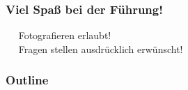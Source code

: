 \documentclass[10pt,t]{beamer}
\begin{document}
\begin{frame}
\begin{columns}
\end{columns}
\vspace*{-8pt}
\end{frame}



\begin{frame}
\frametitle{Viel Spaß bei der Führung!}
\textbullet~~ Fotografieren erlaubt! \\
\textbullet~~ Fragen stellen ausdrücklich erwünscht!
\end{frame}

\begin{frame}\frametitle{Outline}\tableofcontents\end{frame}
\end{document}
